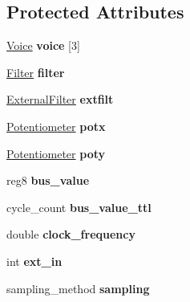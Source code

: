 \subsection*{Protected Attributes}
\begin{DoxyCompactItemize}
\item 
\hypertarget{classSID2_af2e79cbdc28a218607ae2314a6374e20}{\hyperlink{classVoice}{Voice} {\bfseries voice} \mbox{[}3\mbox{]}}\label{classSID2_af2e79cbdc28a218607ae2314a6374e20}

\item 
\hypertarget{classSID2_aff27fc25fb56b4933df4c63c19cfcb7b}{\hyperlink{classFilter}{Filter} {\bfseries filter}}\label{classSID2_aff27fc25fb56b4933df4c63c19cfcb7b}

\item 
\hypertarget{classSID2_a03e83979c2aa4388eb59e326d7c68f15}{\hyperlink{classExternalFilter}{External\-Filter} {\bfseries extfilt}}\label{classSID2_a03e83979c2aa4388eb59e326d7c68f15}

\item 
\hypertarget{classSID2_a9d5bd8956c413530fa6901bceafc8ea9}{\hyperlink{classPotentiometer}{Potentiometer} {\bfseries potx}}\label{classSID2_a9d5bd8956c413530fa6901bceafc8ea9}

\item 
\hypertarget{classSID2_acf195f83ce7fa17a7990713d25ab6184}{\hyperlink{classPotentiometer}{Potentiometer} {\bfseries poty}}\label{classSID2_acf195f83ce7fa17a7990713d25ab6184}

\item 
\hypertarget{classSID2_a07c7368b00895229b48dfd2f4354e342}{reg8 {\bfseries bus\-\_\-value}}\label{classSID2_a07c7368b00895229b48dfd2f4354e342}

\item 
\hypertarget{classSID2_abb7d92ebdf46ba04e253e43ba98bfd6f}{cycle\-\_\-count {\bfseries bus\-\_\-value\-\_\-ttl}}\label{classSID2_abb7d92ebdf46ba04e253e43ba98bfd6f}

\item 
\hypertarget{classSID2_a231c68cc8e5b40d12222c96d1fababc6}{double {\bfseries clock\-\_\-frequency}}\label{classSID2_a231c68cc8e5b40d12222c96d1fababc6}

\item 
\hypertarget{classSID2_a0b16345497af5432aeffdb27a2500558}{int {\bfseries ext\-\_\-in}}\label{classSID2_a0b16345497af5432aeffdb27a2500558}

\item 
\hypertarget{classSID2_a78243cc20b0c21a22b0231f82dde5274}{sampling\-\_\-method {\bfseries sampling}}\label{classSID2_a78243cc20b0c21a22b0231f82dde5274}


\end{DoxyCompactItemize}
